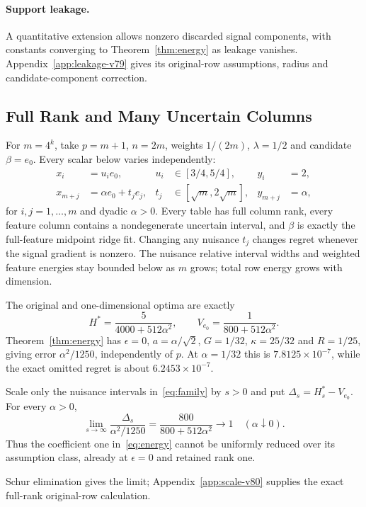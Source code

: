 \paragraph{Support leakage.} A quantitative extension allows nonzero discarded signal components, with constants converging to Theorem~\ref{thm:energy} as leakage vanishes. Appendix~\ref{app:leakage-v79} gives its original-row assumptions, radius and candidate-component correction.

\subsection{Full Rank and Many Uncertain Columns}
For $m=4^k$, take $p=m+1$, $n=2m$, weights $1/(2m)$, $\lambda=1/2$ and candidate $\beta=e_0$. Every scalar below varies independently:
\begin{align}
 x_i&=u_ie_0,&u_i&\in[3/4,5/4],& y_i&=2,\nonumber\\
 x_{m+j}&=\alpha e_0+t_je_j,&t_j&\in[\sqrt m,2\sqrt m],&y_{m+j}&=\alpha,
 \label{eq:family}
\end{align}
for $i,j=1,\ldots,m$ and dyadic $\alpha>0$. Every table has full column rank, every feature column contains a nondegenerate uncertain interval, and $\beta$ is exactly the full-feature midpoint ridge fit. Changing any nuisance $t_j$ changes regret whenever the signal gradient is nonzero. The nuisance relative interval widths and weighted feature energies stay bounded below as $m$ grows; total row energy grows with dimension.

The original and one-dimensional optima are exactly
\begin{equation}
 H^*=\frac5{4000+512\alpha^2},\qquad
 V_{e_0}=\frac1{800+512\alpha^2}.\label{eq:family_optima}
\end{equation}
Theorem~\ref{thm:energy} has $\epsilon=0$, $a=\alpha/\sqrt2$, $G=1/32$, $\kappa=25/32$ and $R=1/25$, giving error $\alpha^2/1250$, independently of $p$. At $\alpha=1/32$ this is $7.8125\times10^{-7}$, while the exact omitted regret is about $6.2453\times10^{-7}$. \begin{corollary}\label{cor:energy-sharp-v81}
Scale only the nuisance intervals in~\eqref{eq:family} by $s>0$ and put $\Delta_s=H_s^*-V_{e_0}$. For every $\alpha>0$,
\[
 \lim_{s\to\infty}\frac{\Delta_s}{\alpha^2/1250}
   =\frac{800}{800+512\alpha^2}\longrightarrow1
 \quad(\alpha\downarrow0).
\]
Thus the coefficient one in~\eqref{eq:energy} cannot be uniformly reduced over its assumption class, already at $\epsilon=0$ and retained rank one.
\end{corollary}
Schur elimination gives the limit; Appendix~\ref{app:scale-v80} supplies the exact full-rank original-row calculation.

